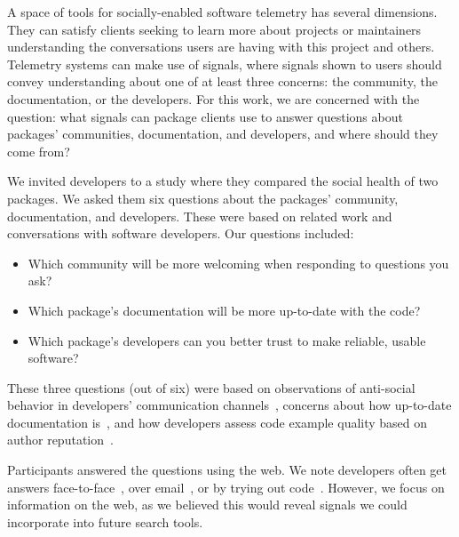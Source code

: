 A space of tools for socially-enabled software telemetry has several dimensions.
They can satisfy clients seeking to learn more about projects or maintainers understanding the conversations users are having with this project and others.
Telemetry systems can make use of signals, where signals shown to users should convey understanding about one of at least three concerns:
the community, the documentation, or the developers.
For this work, we are concerned with the question:
what signals can package clients use to answer questions about packages' communities, documentation, and developers, and where should they come from?
\fi

We invited developers to a study where they compared the social health of two packages.
We asked them six questions about the packages' community, documentation, and developers.
These were based on related work and conversations with software developers.
Our questions included:
\begin{itemize}
\setlength{\itemsep}{0pt}
\setlength{\parskip}{0pt}
\setlength{\parsep}{0pt}  
\item Which community will be more welcoming when responding to questions you ask?
\item Which package's documentation will be more up-to-date with the code?
\item Which package's developers can you better trust to make reliable, usable software?
\end{itemize}
These three questions (out of six) were based on observations of anti-social behavior in developers' communication channels~\cite{storey_revolution_2014}, concerns about how up-to-date documentation is~\cite{storey_revolution_2014,nykaza_what_2002,lethbridge_how_2003,robillard_field_2011}, and how developers assess code example quality based on author reputation~\cite{robillard_field_2011}.

Participants answered the questions using the web.
We note developers often get answers face-to-face~\cite{latoza_maintaining_2006,storey_revolution_2014}, over email~\cite{latoza_maintaining_2006,ko_information_2007}, or by trying out code~\cite{brandt_two_2009}.
However, we focus on information on the web, as we believed this would reveal signals we could incorporate into future search tools.

